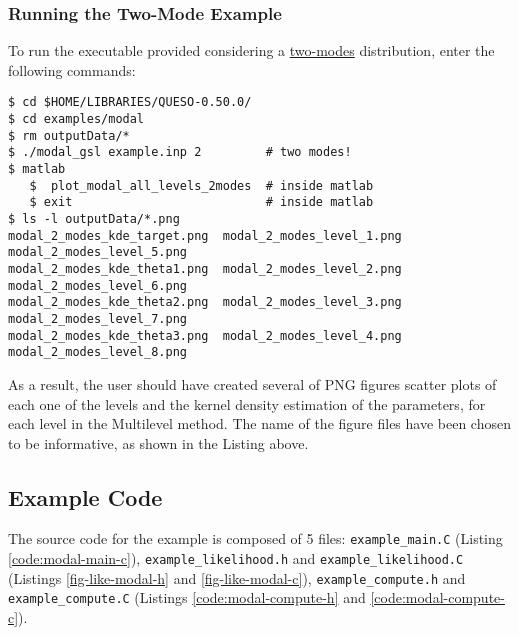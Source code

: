 \subsubsection{Running the Two-Mode Example}
 
To run the executable provided considering a \underline{two-modes} distribution, enter the following commands:
\begin{lstlisting}[label={},caption={Running the example with a two-mode distribution.}]
$ cd $HOME/LIBRARIES/QUESO-0.50.0/
$ cd examples/modal
$ rm outputData/*
$ ./modal_gsl example.inp 2         # two modes!
$ matlab
   $  plot_modal_all_levels_2modes  # inside matlab
   $ exit                           # inside matlab
$ ls -l outputData/*.png
modal_2_modes_kde_target.png  modal_2_modes_level_1.png  modal_2_modes_level_5.png
modal_2_modes_kde_theta1.png  modal_2_modes_level_2.png  modal_2_modes_level_6.png
modal_2_modes_kde_theta2.png  modal_2_modes_level_3.png  modal_2_modes_level_7.png
modal_2_modes_kde_theta3.png  modal_2_modes_level_4.png  modal_2_modes_level_8.png
\end{lstlisting}

As a result, the user should have created several of PNG figures scatter plots of each one of the levels and the kernel density estimation of the parameters, for each level in the Multilevel method. The name of the figure files have been chosen to be informative, as shown in the Listing above. 



\subsection{Example Code}\label{sec:modal-code}

The source code for the example is composed of 5 files:
\texttt{example\_main.C} (Listing \ref{code:modal-main-c}), \linebreak
\texttt{example\_likelihood.h} and \texttt{example\_likelihood.C} (Listings \ref{fig-like-modal-h} and \ref{fig-like-modal-c}),
\texttt{example\_compute.h} and \texttt{example\_compute.C} (Listings \ref{code:modal-compute-h} and \ref{code:modal-compute-c}).






